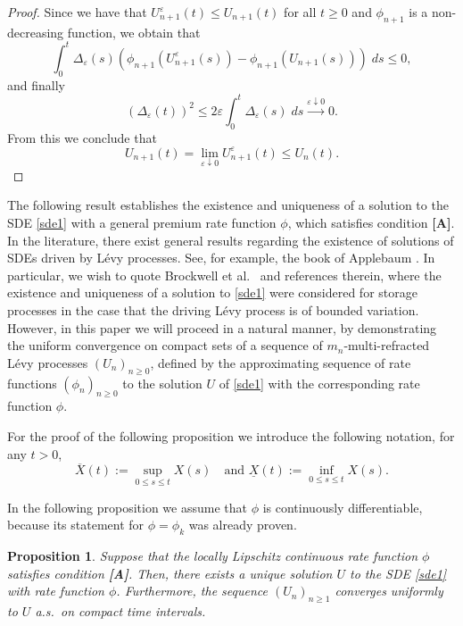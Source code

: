 \documentclass[12pt,reqno]{amsart}
\newcommand{\blue}{\textcolor[rgb]{0.00,0.00,1.00}}
\newtheorem{prop}[theorem]{Proposition}
\theoremstyle{definition}
\theoremstyle{remark}
\begin{document}
\begin{proof}
Since we have that $U^{\varepsilon}_{n+1}(t)\leq U_{n+1}(t)$ for all $t\geq 0$ and $\phi_{n+1}$ is a non-decreasing function, we obtain that
$$\int_0^t \Delta_{\varepsilon}(s)( \phi_{n+1}(U^{\varepsilon}_{n+1}(s))-\phi_{n+1}(U_{n+1}(s)))\;ds \leq 0,$$ and finally 
	 $$(\Delta_{\varepsilon}(t))^2 \leq 2\varepsilon \int_0^t \Delta_{\varepsilon}(s) \;ds \stackrel{\varepsilon \downarrow  0}{\longrightarrow} 0. $$
	From this we conclude that 
	\[
		U_{n+1}(t)=\lim_{\varepsilon\downarrow0}U^{\varepsilon}_{n+1}(t)\leq U_n(t).
		\]
\end{proof}
		
   
		

The following result establishes the existence and uniqueness of a solution to the SDE \eqref{sde1} with a general premium rate function {$\phi$}, which satisfies condition \textbf{[A]}. 
In the literature, there exist general results regarding the existence of solutions of SDEs driven by L\'evy processes. See, for example, the book of Applebaum \cite{applebaum2004}. In particular, 
we wish to quote Brockwell et al.\ \cite{brockwelletal82} and references therein, where the existence and uniqueness 
of a solution to \eqref{sde1} were considered for storage processes in the case that the driving L\'evy process is of bounded variation.  
However, in this paper we will proceed in a natural manner, by demonstrating the uniform convergence on compact sets of a sequence of 
$m_n$-multi-refracted L\'{e}vy processes $(U_n)_{n\geq0}$, 
defined by the approximating sequence of rate functions $(\phi_n)_{n\geq0}$ to the solution $U$ of \eqref{sde1} with the corresponding rate function $\phi$.

For the proof of the following proposition we introduce the following notation, for any $t>0$,
\[
\overline{X}(t):=\sup_{0\leq s\leq t}X(s)\quad\text{and }\underline{X}(t):=\inf_{0\leq s\leq t}X(s).
\]


In the following proposition we assume that $\phi$ is continuously differentiable, because its statement for $\phi=\phi_k$ was already proven. 
\begin{prop}\label{conv_processes} Suppose that the locally Lipschitz continuous rate function  $\phi$ satisfies condition \textbf{[A]}. 
Then, there exists a unique solution $U$ to the SDE \eqref{sde1} with rate function $\phi$. 
Furthermore, the sequence $(U_n)_{n\geq 1}$ converges uniformly to $U$ a.s.\ on compact time intervals.
  \end{prop}
\end{document}
